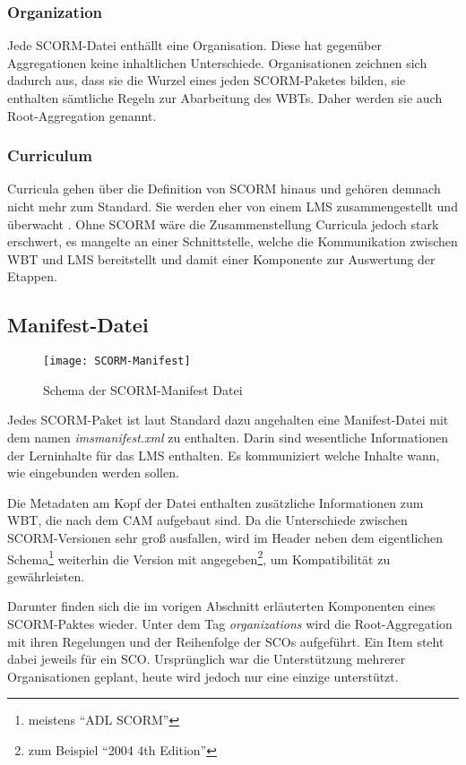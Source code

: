 \subsubsection{Organization}
Jede SCORM-Datei enthällt eine Organisation. Diese hat gegenüber Aggregationen
keine inhaltlichen Unterschiede. Organisationen zeichnen sich dadurch aus, dass
sie die Wurzel eines jeden SCORM-Paketes bilden, sie enthalten sämtliche Regeln
zur Abarbeitung des WBTs. Daher werden sie auch Root-Aggregation genannt.
\cite{adl:2011}

\subsubsection{Curriculum}
Curricula gehen über die Definition von SCORM hinaus und gehören demnach nicht
mehr zum Standard. Sie werden eher von einem LMS zusammengestellt und überwacht
\cite{adl:2011}. Ohne SCORM wäre die Zusammenstellung Curricula jedoch stark
erschwert, es mangelte an einer Schnittstelle, welche die Kommunikation zwischen
WBT und LMS bereitstellt und damit einer Komponente zur Auswertung der
Etappen.

\subsection{Manifest-Datei}
\begin{wrapfigure}{r}{0.5\textwidth}
\vspace{-15pt} 
\texttt{[image: SCORM-Manifest]}
\vspace{-20pt}
\caption{Schema der SCORM-Manifest Datei\footnotemark}\label{pic:scormManifest}
\vspace{-15pt} 
\end{wrapfigure}
Jedes SCORM-Paket ist laut Standard dazu angehalten eine Manifest-Datei mit dem
namen \textit{imsmanifest.xml} zu enthalten. Darin sind wesentliche
Informationen der Lerninhalte für das LMS enthalten. Es kommuniziert welche
Inhalte wann, wie eingebunden werden sollen.

Die Metadaten am Kopf der Datei enthalten zusätzliche Informationen zum WBT, die
nach dem \ac{CAM} aufgebaut sind. Da die Unterschiede zwischen
SCORM-Versionen sehr groß ausfallen, wird im Header neben dem
eigentlichen Schema\footnote{meistens "`ADL SCORM"'} weiterhin die Version
mit angegeben\footnote{zum Beispiel "`2004 4th Edition"'}, um Kompatibilität zu
gewährleisten. 

Darunter finden sich die im vorigen Abschnitt erläuterten Komponenten eines
SCORM-Paktes wieder. Unter dem Tag \textit{organizations} wird die
Root-Aggregation mit ihren Regelungen und der Reihenfolge der SCOs aufgeführt. Ein
Item steht dabei jeweils für ein SCO. Ursprünglich war die Unterstützung
mehrerer Organisationen geplant, heute wird jedoch nur eine einzige unterstützt.


